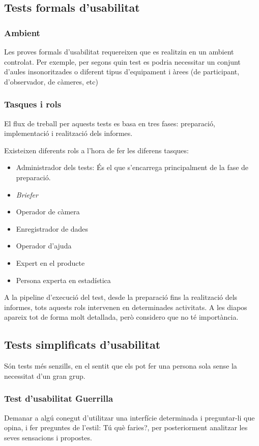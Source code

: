 \documentclass[12pt]{article}
\begin{document}
    \subsection{Tests formals d'usabilitat}
    \subsubsection {Ambient}
    Les proves formals d'usabilitat requereixen que es realitzin en un ambient controlat. Per exemple, per segons quin test es podria
    necessitar un conjunt d'aules insonoritzades o diferent tipus d'equipament i àrees (de participant, d'observador, de càmeres, etc)

    \subsubsection{Tasques i rols}
    El flux de treball per aquests tests es basa en tres fases: preparació, implementació i realització dels informes.

    Existeixen diferents rols a l'hora de fer les diferens tasques:
    \begin{itemize} 
        \item Administrador dels tests: És el que s'encarrega principalment de la fase de preparació.
        \item \textit{Briefer}
        \item Operador de càmera    
        \item Enregistrador de dades
        \item Operador d'ajuda
        \item Expert en el producte
        \item Persona experta en estadística
    \end{itemize}

    A la pipeline d'execució del test, desde la preparació fins la realització dels informes, tots aquests rols intervenen en determinades activitats. A les diapos apareix
    tot de forma molt detallada, però considero que no té importància.

    \subsection{Tests simplificats d'usabilitat}
    Són tests més senzills, en el sentit que els pot fer una persona sola sense la necessitat d'un gran grup.
    \subsubsection{Test d'usabilitat Guerrilla}
    Demanar a algú conegut d'utilitzar una interfície determinada i preguntar-li que opina, i fer preguntes de l'estil: Tú què faries?, per posteriorment analitzar les
    seves sensacions i propostes.
\end{document}
